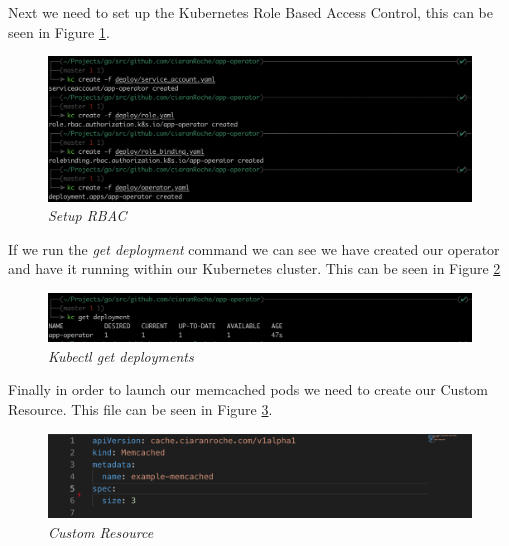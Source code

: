 Next we need to set up the Kubernetes Role Based Access Control, this can be seen in Figure \ref{img:op03}.
\begin{figure}[!ht]
\centering
\includegraphics*[width=1\textwidth]{images/op03.png}
\caption{\em Setup RBAC}
\label{img:op03}
\end{figure}

If we run the \textit{get deployment} command we can see we have created our operator and have it running within our Kubernetes cluster. This can be seen in Figure \ref{img:op04}
\begin{figure}[!ht]
\centering
\includegraphics*[width=1\textwidth]{images/op04.png}
\caption{\em Kubectl get deployments}
\label{img:op04}
\end{figure}

Finally in order to launch our memcached pods we need to create our Custom Resource. This file can be seen in Figure \ref{img:op05}.
\begin{figure}[!ht]
\centering
\includegraphics*[width=1\textwidth]{images/op05.png}
\caption{\em Custom Resource}
\label{img:op05}
\end{figure}

